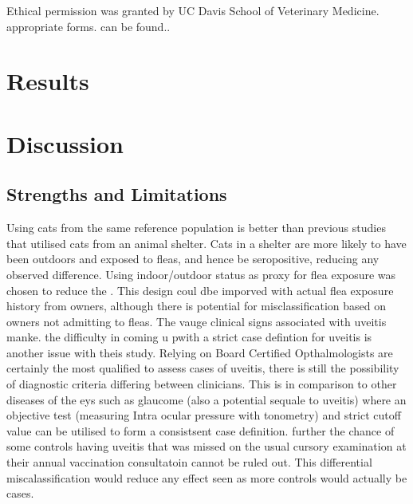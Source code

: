 \documentclass[11pt,twocolumn]{article}
\begin{document}


	Ethical permission was granted by UC Davis School of Veterinary Medicine. appropriate forms. can be found..

\section{Results}
\section{Discussion}
	\subsection{Strengths and Limitations}
		Using cats from the same reference population is better than previous studies that utilised cats from an animal shelter. Cats in a shelter are more likely to have been outdoors and exposed to fleas, and hence be seropositive, reducing any observed difference.
		Using indoor/outdoor status as proxy for flea exposure was chosen to reduce the . 
		This design coul dbe imporved with actual flea exposure history from owners, although there is potential for misclassification based on owners not admitting to fleas.
		The vauge clinical signs associated with uveitis manke.
		the difficulty in coming u pwith a strict case defintion for uveitis is another issue with theis study. Relying on Board Certified Opthalmologists are certainly the most qualified to assess cases of uveitis, there is still the possibility of diagnostic criteria differing between clinicians. This is in comparison to other diseases of the eys such as glaucome (also a potential sequale to uveitis) where an objective test (measuring Intra ocular pressure with tonometry) and strict cutoff value can be utilised to form a consistsent case definition.
		further the chance of some controls having uveitis that was missed on the usual cursory examination at their annual vaccination consultatoin cannot be ruled out. This differential miscalassification would reduce any effect seen as more controls would actually be cases.

\newpage


\end{document}
